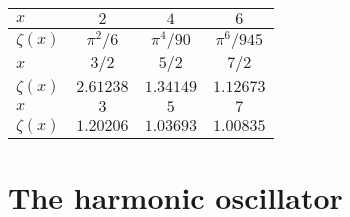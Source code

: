 \documentclass[11pt,letter, swedish, english, twocolumn
]{article}
\begin{document}
\begin{center}
\begin{tabular}{|l||c|c|c|}\hline
$x$ & $2$ & $4$ & $6$
\\ \hline $\zeta(x)$ & 
$\pi^2/6$ & $\pi^4/90$ & $\pi^6/945$ 
\\ \hline\hline
$x$ & $3/2$ & $5/2$ & $7/2$
\\ \hline $\zeta(x)$ & 
$2.61238$ & $1.34149$ & $1.12673$ 
\\ \hline\hline
$x$ & $3$ & $5$ & $7$
\\ \hline$\zeta(x)$ & 
$1.20206$ & $1.03693$ & $1.00835$ 
\\ \hline
\end{tabular}
\end{center}



\section{The harmonic oscillator}
\end{document}
